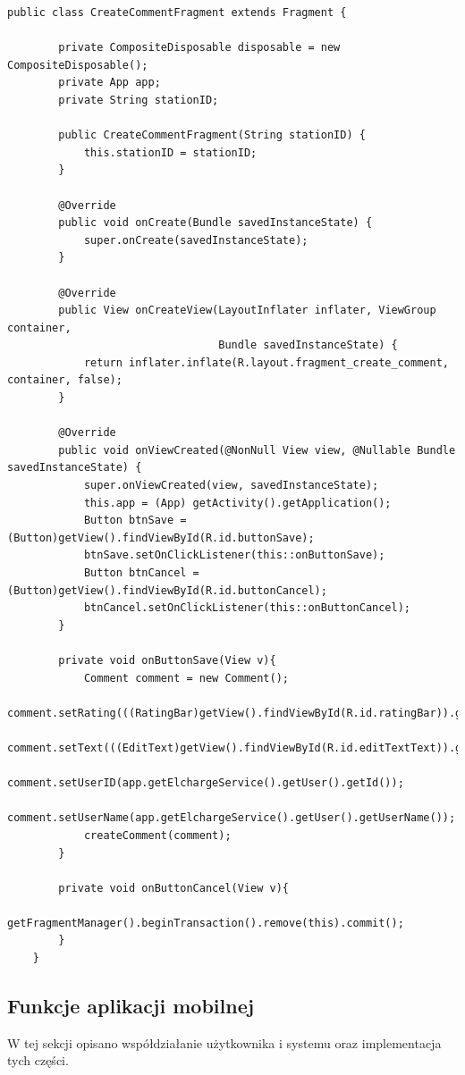 \begin{lstlisting}[label=list:CreateCommentFragment,caption=Klasa opisująca zachowanie elementów na fragemencie tworzenia komentarza.,basicstyle=\tiny\ttfamily]
    public class CreateCommentFragment extends Fragment {

        private CompositeDisposable disposable = new CompositeDisposable();
        private App app;
        private String stationID;
    
        public CreateCommentFragment(String stationID) {
            this.stationID = stationID;
        }
    
        @Override
        public void onCreate(Bundle savedInstanceState) {
            super.onCreate(savedInstanceState);
        }
    
        @Override
        public View onCreateView(LayoutInflater inflater, ViewGroup container,
                                 Bundle savedInstanceState) {
            return inflater.inflate(R.layout.fragment_create_comment, container, false);
        }
    
        @Override
        public void onViewCreated(@NonNull View view, @Nullable Bundle savedInstanceState) {
            super.onViewCreated(view, savedInstanceState);
            this.app = (App) getActivity().getApplication();
            Button btnSave = (Button)getView().findViewById(R.id.buttonSave);
            btnSave.setOnClickListener(this::onButtonSave);
            Button btnCancel = (Button)getView().findViewById(R.id.buttonCancel);
            btnCancel.setOnClickListener(this::onButtonCancel);
        }
    
        private void onButtonSave(View v){
            Comment comment = new Comment();
            comment.setRating(((RatingBar)getView().findViewById(R.id.ratingBar)).getRating());
            comment.setText(((EditText)getView().findViewById(R.id.editTextText)).getText().toString());
            comment.setUserID(app.getElchargeService().getUser().getId());
            comment.setUserName(app.getElchargeService().getUser().getUserName());
            createComment(comment);
        }
    
        private void onButtonCancel(View v){
            getFragmentManager().beginTransaction().remove(this).commit();
        }
    }
\end{lstlisting}

\subsection{Funkcje aplikacji mobilnej}
W tej sekcji opisano współdziałanie użytkownika i systemu oraz implementacja tych części.

